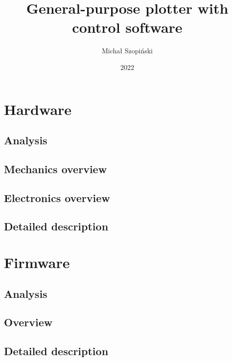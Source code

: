 \documentclass[
    bindingoffset=5mm,
    footnoteindent=3mm,
    hyphenation=true
]{template/wut-thesis}
\begin{document}
\title{
    General-purpose plotter with control software
}
\author{Michał Szopiński}
\date{2022}
\maketitle

\cleardoublepage


\pagestyle{plain}

\cleardoublepage
\tableofcontents

\cleardoublepage
\pagestyle{headings}



\clearpage
\section{Hardware}
\subsection{Analysis}
\subsection{Mechanics overview}
\subsection{Electronics overview}
\subsection{Detailed description}

\section{Firmware}
\subsection{Analysis}
\subsection{Overview}
\subsection{Detailed description}
\end{document}
